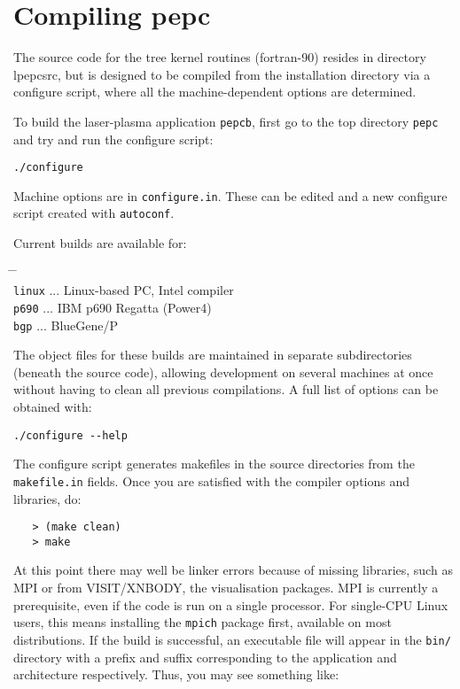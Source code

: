 \documentclass[11pt,psfig]{article}
\begin{document}
\section{Compiling {\sc pepc}} 

The source code for the tree kernel routines (fortran-90) resides in directory
lpepcsrc, but is designed to be compiled from the installation directory via a configure script, where all the machine-dependent options are determined.

\medskip\noindent
To build the laser-plasma application {\tt pepcb}, first go to the top directory
{\tt pepc} and try and run the configure script:

\begin{verbatim}
./configure
\end{verbatim}

Machine options are in \texttt{configure.in}.  These can be edited and a new configure script created with \texttt{autoconf}.

Current builds are available for:
\begin{tabbing}
\hspace{1cm} \= \hspace{3cm} \= \hspace{1cm} \=\\
\> \texttt{linux} \> ... \> Linux-based PC, Intel compiler\\
\> \texttt{p690} \> ... \> IBM p690 Regatta (Power4)\\
\> \texttt{bgp} \> ... \> BlueGene/P \\
\end{tabbing}

The object files for these builds are maintained in separate subdirectories (beneath the source code), allowing development on several machines
at once without having to clean all previous compilations.
A full list of options can be obtained with:
\begin{verbatim}
./configure --help
\end{verbatim}

The configure script generates makefiles in the source directories from the \texttt{makefile.in} fields.  Once you are satisfied with the compiler options and libraries, do:

\begin{verbatim}
   > (make clean)
   > make
\end{verbatim}


\medskip\noindent
At this point there may well be linker errors because of missing
libraries, such as MPI or from VISIT/XNBODY, the visualisation packages.  MPI is
currently a prerequisite, even if the code is run on a single processor.  For
single-CPU Linux users, this means installing the {\tt mpich} package first, available on
most distributions.  If the build is successful, an executable file will appear in the \texttt{bin/} directory with a prefix and suffix corresponding to the application and architecture respectively.  Thus, you may see something like:
\end{document}
